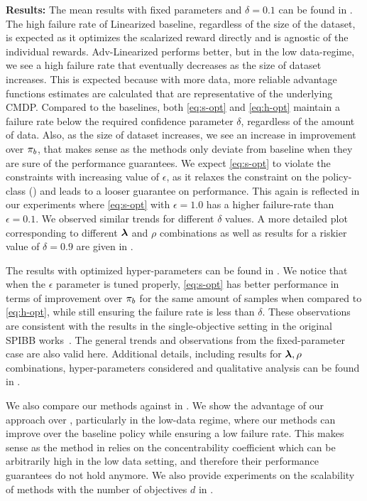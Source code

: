 \textbf{Results:} 
The mean results with fixed parameters and $\delta=0.1$ can be found in . 
The high failure rate of Linearized baseline, regardless of the size of the dataset, is expected as it optimizes the scalarized reward directly and is agnostic of the individual rewards. Adv-Linearized performs better, but in the low data-regime, we see a high failure rate that eventually decreases as the size of dataset increases. This is expected because with more data, more reliable advantage functions estimates are calculated that are representative of the underlying CMDP. 
Compared to the baselines, both \ref{eq:s-opt} and \ref{eq:h-opt} maintain a failure rate below the required confidence parameter $\delta$, regardless of the amount of data.
Also, as the size of dataset increases, we see an increase in improvement over $\pi_{b}$, that makes sense as the methods only deviate from baseline when they are sure of the performance guarantees. We expect \ref{eq:s-opt} to violate the constraints with increasing value of $\epsilon$, as it relaxes the constraint on the policy-class () and leads to a looser guarantee on performance. This again is reflected in our experiments where \ref{eq:s-opt} with $\epsilon=1.0$ has a higher failure-rate than $\epsilon=0.1$.
We observed similar trends for different $\delta$ values.
A more detailed plot corresponding to different $\bm{\lambda}$ and $\rho$ combinations as well as results for a riskier value of $\delta=0.9$ are given in .


The results with optimized hyper-parameters can be found in .
We notice that when the $\epsilon$ parameter is tuned properly, \ref{eq:s-opt} has better performance in terms of improvement over $\pi_{b}$ for the same amount of samples when compared to \ref{eq:h-opt}, while still ensuring the failure rate is less than $\delta$. These observations are consistent with the results in the single-objective setting in the original SPIBB works~\citep{laroche2017safe, nadjahi2019safe}.
The general trends and observations from the fixed-parameter case are also valid here.  Additional details, including results for $\bm{\lambda}, \rho$ combinations, hyper-parameters considered and qualitative analysis can be found in . 

We also compare our methods against \cite{le2019batch} in . We show the advantage of our approach over \cite{le2019batch}, particularly in the low-data regime, where our methods can improve over the baseline policy while ensuring a low failure rate. 
This makes sense as the method in \cite{le2019batch} relies on the concentrability coefficient which can be arbitrarily high in the low data setting, and therefore their performance guarantees do not hold anymore.
We also provide experiments on the scalability of methods with the number of objectives $d$ in .
